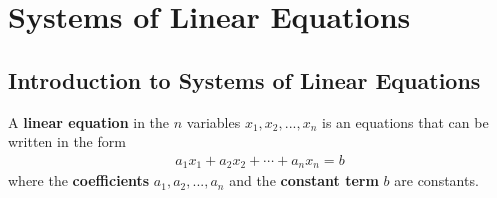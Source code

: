 \documentclass{article}
\begin{document}
\section{Systems of Linear Equations}
\subsection{Introduction to Systems of Linear Equations}
\begin{definition}
	A \textbf{linear equation} in the $n$ variables $x_1, x_2, ..., x_n$ is an equations that can be written in the form
	\begin{gather*}
		a_1x_1+a_2x_2+\cdots+a_nx_n=b
	\end{gather*}
	where the \textbf{coefficients} $a_1, a_2, ..., a_n$ and the \textbf{constant term} $b$ are constants.
\end{definition}
\end{document}
